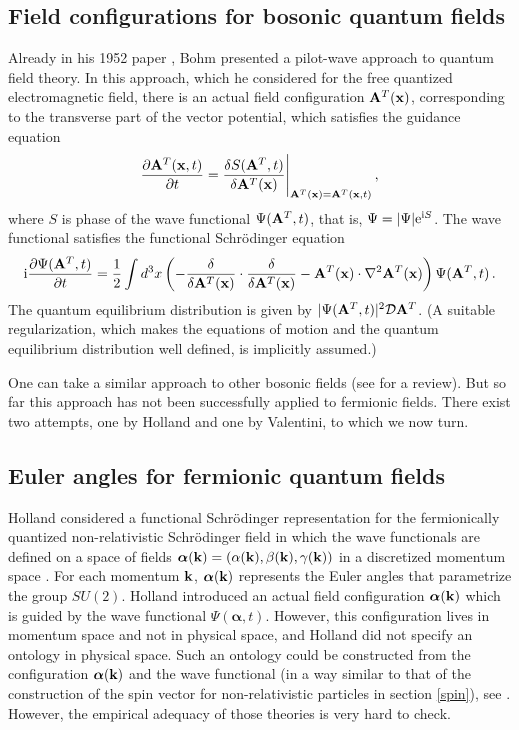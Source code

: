 \documentclass[11pt]{article}
\def\ii{\textrm i}
\def\ee{\textrm e}
\begin{document}
\subsection{Field configurations for bosonic quantum fields}
Already in his 1952 paper \cite{bohm52b}, Bohm presented a pilot-wave approach to quantum field theory. In this approach, which he considered for the free quantized electromagnetic field, there is an actual field configuration ${\bf A}^T({\bf x})$, corresponding to the transverse part of the vector potential, which satisfies the guidance equation
\begin{equation}
\frac{\partial {\bf A}^T ({\bf x},t)}{\partial t} = \frac{\delta S ({\bf A}^T,t)}{\delta {\bf A}^T({\bf x})}\Bigg|_{{\bf A}^T({\bf x}) = {\bf A}^T ({\bf x},t)} \,,
\label{5}
\end{equation}
where $S$ is phase of the wave functional $\Psi({\bf A}^T,t)$, that is, $\Psi = |\Psi|\ee^{\ii S}$. The wave functional satisfies the functional Schr\"odinger equation
\begin{equation}
\ii\frac{\partial \Psi({\bf A}^T,t)}{\partial t} = \frac{1}{2}  \int d^3 x \left( -\frac{\delta}{ \delta {\bf A}^T({\bf x})} \cdot \frac{\delta}{\delta {\bf A}^T({\bf x})} -  {\bf A}^T({\bf x}) \cdot \nabla^2 {\bf A}^T({\bf x})  \right)\Psi({\bf A}^T,t) \,.
\label{6}
\end{equation}
The quantum equilibrium distribution is given by $|\Psi({\bf A}^T,t)|^2 {\mathcal{D}} {\bf A}^T$. (A suitable regularization, which makes the equations of motion and the quantum equilibrium distribution well defined, is implicitly assumed.)

One can take a similar approach to other bosonic fields (see \cite{struyve10} for a review). But so far this approach has not been successfully applied to fermionic fields. There exist two attempts, one by Holland and one by Valentini, to which we now turn. 

\subsection{Euler angles for fermionic quantum fields}
Holland considered a functional Schr\"odinger representation for the fermionically quantized non-relativistic Schr\"odinger field in which the wave functionals are defined on a space of fields ${\boldsymbol{\alpha}}({\bf k}) = (\alpha({\bf k}),\beta({\bf k}),\gamma({\bf k}))$ in a discretized momentum space \cite{holland881,holland93b}. For each momentum ${\bf k}$, ${\boldsymbol \alpha}({\bf k})$ represents the Euler angles that parametrize the group $SU(2)$. Holland introduced an actual field configuration ${\boldsymbol{\alpha}}({\bf k})$ which is guided by the wave functional $\Psi({\boldsymbol{\alpha}},t)$. However, this configuration lives in momentum space and not in physical space, and Holland did not specify an ontology in physical space. Such an ontology could be constructed from the configuration ${\boldsymbol \alpha}({\bf k})$ and the wave functional (in a way similar to that of the construction of the spin vector for non-relativistic particles in section \ref{spin}), see \cite{struyve10}. However, the empirical adequacy of those theories is very hard to check. 
\end{document}
